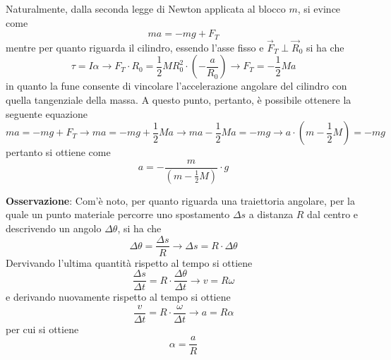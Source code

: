 \documentclass[a4paper]{extarticle}
\begin{document}
\noindent
Naturalmente, dalla seconda legge di Newton applicata al blocco $m$, si evince come
\[ma = -mg + F_T\]
mentre per quanto riguarda il cilindro, essendo l'asse fisso e $\vec F_T \perp \vec R_0$ si ha che
\[\tau = I \alpha \longrightarrow F_T \cdot R_0 = \frac{1}{2}M R_0^2 \cdot \left(-\frac{a}{R_0}\right) \longrightarrow F_T = -\frac{1}{2}M a\]
in quanto la fune consente di vincolare l'accelerazione angolare del cilindro con quella tangenziale della massa. A questo punto, pertanto, è possibile ottenere la seguente equazione
\[ma = -mg + F_T \longrightarrow ma=-mg+\frac{1}{2}Ma \longrightarrow ma-\frac{1}{2}Ma=-mg \longrightarrow a \cdot \left(m-\frac{1}{2}M\right)=-mg\]
pertanto si ottiene come
\[a=-\frac{m}{\displaystyle{\left(m-\frac{1}{2}M\right)}} \cdot g\]

\vspace{1em}
\noindent
\textbf{Osservazione}: Com'è noto, per quanto riguarda una traiettoria angolare, per la quale un punto materiale percorre uno spostamento $\Delta s$ a distanza $R$ dal centro e descrivendo un angolo $\Delta \theta$, si ha che
\[\Delta \theta=\frac{\Delta s}{R} \longrightarrow \Delta s = R \cdot \Delta \theta \]
Dervivando l'ultima quantità rispetto al tempo si ottiene
\[\frac{\Delta s}{\Delta t} = R \cdot \frac{\Delta \theta}{\Delta t} \longrightarrow v = R \omega\]
e derivando nuovamente rispetto al tempo si ottiene
\[\frac{v}{\Delta t} = R \cdot \frac{\omega}{\Delta t} \longrightarrow a = R \alpha\]
per cui si ottiene
\[\boxed{\alpha=\frac{a}{R}}\]

\vspace{1em}
\end{document}
